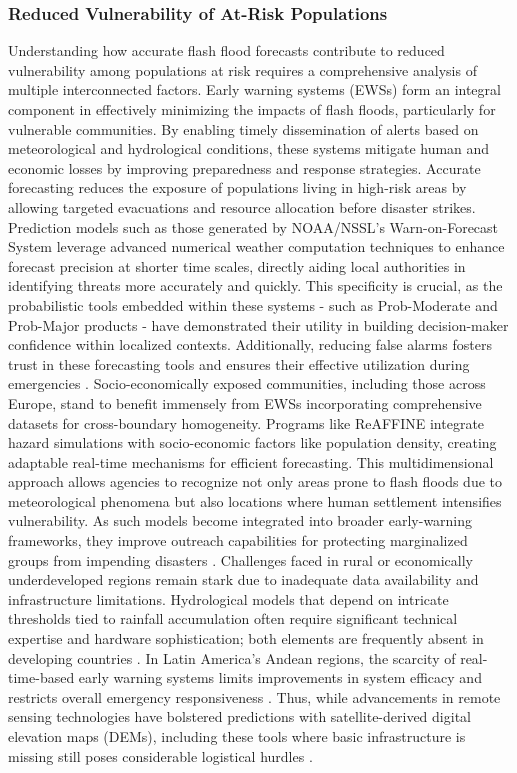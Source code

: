\subsubsection{Reduced Vulnerability of At-Risk Populations}
Understanding how accurate flash flood forecasts contribute to reduced vulnerability among populations at risk requires a comprehensive analysis of multiple interconnected factors. Early warning systems (EWSs) form an integral component in effectively minimizing the impacts of flash floods, particularly for vulnerable communities. By enabling timely dissemination of alerts based on meteorological and hydrological conditions, these systems mitigate human and economic losses by improving preparedness and response strategies.
Accurate forecasting reduces the exposure of populations living in high-risk areas by allowing targeted evacuations and resource allocation before disaster strikes. Prediction models such as those generated by NOAA/NSSL's Warn-on-Forecast System leverage advanced numerical weather computation techniques to enhance forecast precision at shorter time scales, directly aiding local authorities in identifying threats more accurately and quickly. This specificity is crucial, as the probabilistic tools embedded within these systems - such as Prob-Moderate and Prob-Major products - have demonstrated their utility in building decision-maker confidence within localized contexts. Additionally, reducing false alarms fosters trust in these forecasting tools and ensures their effective utilization during emergencies \citep{Martinaitis2023}.
Socio-economically exposed communities, including those across Europe, stand to benefit immensely from EWSs incorporating comprehensive datasets for cross-boundary homogeneity. Programs like ReAFFINE integrate hazard simulations with socio-economic factors like population density, creating adaptable real-time mechanisms for efficient forecasting. This multidimensional approach allows agencies to recognize not only areas prone to flash floods due to meteorological phenomena but also locations where human settlement intensifies vulnerability. As such models become integrated into broader early-warning frameworks, they improve outreach capabilities for protecting marginalized groups from impending disasters \citep{Ritter2021a}.
Challenges faced in rural or economically underdeveloped regions remain stark due to inadequate data availability and infrastructure limitations. Hydrological models that depend on intricate thresholds tied to rainfall accumulation often require significant technical expertise and hardware sophistication; both elements are frequently absent in developing countries \citep{Javelle2016}\citep{AlRawas2024}. In Latin America's Andean regions, the scarcity of real-time-based early warning systems limits improvements in system efficacy and restricts overall emergency responsiveness \citep{Henao2022}\citep{Henao2022a}. Thus, while advancements in remote sensing technologies have bolstered predictions with satellite-derived digital elevation maps (DEMs), including these tools where basic infrastructure is missing still poses considerable logistical hurdles \citep{Pham2020}.
